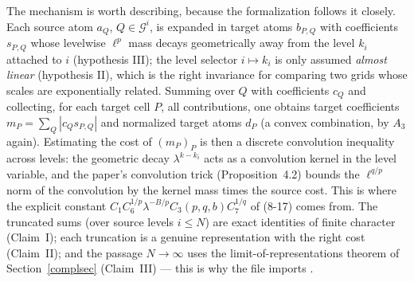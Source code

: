 \documentclass[11pt]{amsart}
\theoremstyle{definition}
\newcommand{\lean}[1]{\ifmmode\mbox{\leanname{#1}}\else\hspace{0pt}\leanname{#1}\fi}
\begin{document}
The mechanism is worth describing, because the formalization follows it
closely. Each source atom $a_Q$, $Q \in \mathcal{G}^i$, is expanded in
target atoms $b_{P,Q}$ with coefficients $s_{P,Q}$ whose levelwise
$\ell^p$ mass decays geometrically away from the level $k_i$ attached to
$i$ (hypothesis III); the level selector $i \mapsto k_i$ is only assumed
\emph{almost linear} (hypothesis II), which is the right invariance for
comparing two grids whose scales are exponentially related. Summing over
$Q$ with coefficients $c_Q$ and collecting, for each target cell $P$, all
contributions, one obtains target coefficients
$m_P = \sum_Q |c_Q s_{P,Q}|$ and normalized target atoms $d_P$ (a convex
combination, by $A_3$ again). Estimating the cost of $(m_P)_P$ is then a
discrete convolution inequality across levels: the geometric decay
$\lambda^{k-k_i}$ acts as a convolution kernel in the level variable, and
the paper's convolution trick (Proposition~4.2) bounds the $\ell^{q/p}$
norm of the convolution by the kernel mass times the source cost. This is
where the explicit constant
$C_1 C_6^{1/p} \lambda^{-B/p} C_3(p,q,b) C_7^{1/q}$ of (8-17) comes from.
The truncated sums (over source levels $i \leq N$) are exact identities of
finite character (Claim~I); each truncation is a genuine representation
with the right cost (Claim~II); and the passage $N \to \infty$ uses the
limit-of-representations theorem of Section~\ref{complsec} (Claim~III) ---
this is why the file imports \lean{Completeness}.
\end{document}
